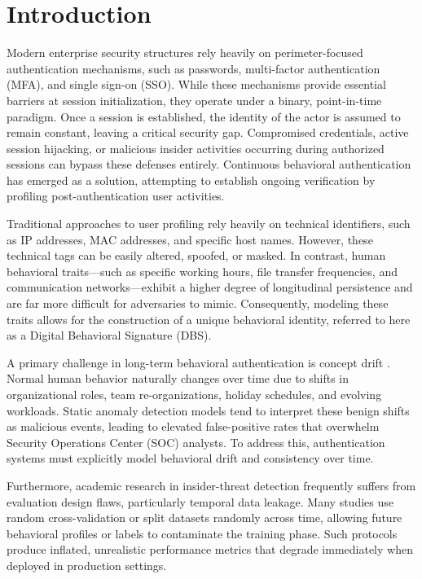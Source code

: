 \documentclass[pdflatex,sn-mathphys-num]{sn-jnl}
\theoremstyle{thmstyleone}
\theoremstyle{thmstyletwo}
\theoremstyle{thmstylethree}
\begin{document}
\section{Introduction}\label{sec1}
Modern enterprise security structures rely heavily on perimeter-focused authentication mechanisms, such as passwords, multi-factor authentication (MFA), and single sign-on (SSO). While these mechanisms provide essential barriers at session initialization, they operate under a binary, point-in-time paradigm. Once a session is established, the identity of the actor is assumed to remain constant, leaving a critical security gap. Compromised credentials, active session hijacking, or malicious insider activities occurring during authorized sessions can bypass these defenses entirely. Continuous behavioral authentication has emerged as a solution, attempting to establish ongoing verification by profiling post-authentication user activities.

Traditional approaches to user profiling rely heavily on technical identifiers, such as IP addresses, MAC addresses, and specific host names. However, these technical tags can be easily altered, spoofed, or masked. In contrast, human behavioral traits---such as specific working hours, file transfer frequencies, and communication networks---exhibit a higher degree of longitudinal persistence and are far more difficult for adversaries to mimic. Consequently, modeling these traits allows for the construction of a unique behavioral identity, referred to here as a Digital Behavioral Signature (DBS).

A primary challenge in long-term behavioral authentication is concept drift \cite{gama2014survey}. Normal human behavior naturally changes over time due to shifts in organizational roles, team re-organizations, holiday schedules, and evolving workloads. Static anomaly detection models tend to interpret these benign shifts as malicious events, leading to elevated false-positive rates that overwhelm Security Operations Center (SOC) analysts. To address this, authentication systems must explicitly model behavioral drift and consistency over time.

Furthermore, academic research in insider-threat detection frequently suffers from evaluation design flaws, particularly temporal data leakage. Many studies use random cross-validation or split datasets randomly across time, allowing future behavioral profiles or labels to contaminate the training phase. Such protocols produce inflated, unrealistic performance metrics that degrade immediately when deployed in production settings.
\end{document}
